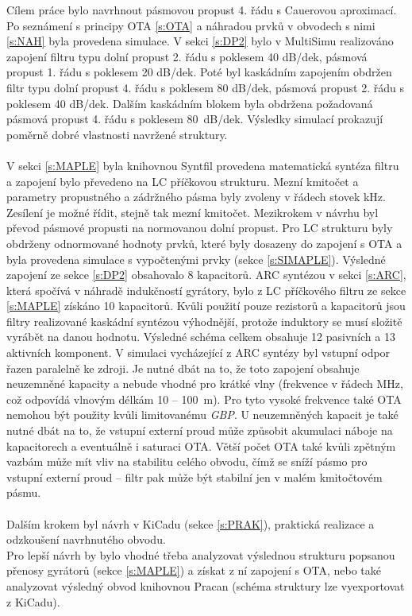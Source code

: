 \noindent Cílem práce bylo navrhnout pásmovou propust 4. řádu s Cauerovou aproximací. Po seznámení s principy OTA \ref{s:OTA} a náhradou prvků v obvodech s nimi \ref{s:NAH} byla provedena simulace. V sekci \ref{s:DP2} bylo v MultiSimu realizováno zapojení filtru typu dolní propust 2. řádu s poklesem 40 dB/dek, pásmová propust 1. řádu s poklesem 20 dB/dek. Poté byl kaskádním zapojením obdržen filtr typu dolní propust 4. řádu s poklesem 80 dB/dek, pásmová propust 2. řádu s poklesem 40 dB/dek. Dalším kaskádním blokem byla obdržena požadovaná pásmová propust 4. řádu s poklesem 80~dB/dek. Výsledky simulací prokazují poměrně dobré vlastnosti navržené struktury.\\
\\
V sekci \ref{s:MAPLE} byla knihovnou Syntfil provedena matematická syntéza filtru a zapojení bylo převedeno na LC příčkovou strukturu. Mezní kmitočet a parametry propustného a zádržného pásma byly zvoleny v řádech stovek kHz. Zesílení je možné řídit, stejně tak mezní kmitočet. Mezikrokem v návrhu byl převod pásmové propusti na normovanou dolní propust. Pro LC strukturu byly obdrženy odnormované hodnoty prvků, které byly dosazeny do zapojení s OTA a byla provedena simulace s vypočtenými prvky (sekce \ref{s:SIMAPLE}). Výsledné zapojení ze sekce \ref{s:DP2} obsahovalo 8 kapacitorů. ARC syntézou v sekci \ref{s:ARC}, která spočívá v náhradě indukčností gyrátory, bylo z LC příčkového filtru ze sekce \ref{s:MAPLE} získáno 10 kapacitorů. Kvůli použití pouze rezistorů a kapacitorů jsou filtry realizované kaskádní syntézou výhodnější, protože induktory se musí složitě vyrábět na danou hodnotu. Výsledné schéma celkem obsahuje 12 pasivních a 13 aktivních komponent. V simulaci vycházející z ARC syntézy byl vstupní odpor řazen paralelně ke zdroji. Je nutné dbát na to, že toto zapojení obsahuje neuzemněné kapacity a nebude vhodné pro krátké vlny (frekvence v řádech MHz, což odpovídá vlnovým délkám 10 -- 100~m). Pro tyto vysoké frekvence také OTA nemohou být použity kvůli limitovanému \textit{GBP}. U neuzemněných kapacit je také nutné dbát na to, že vstupní externí proud může způsobit akumulaci náboje na kapacitorech a eventuálně i saturaci OTA. Větší počet OTA také kvůli zpětným vazbám může mít vliv na stabilitu celého obvodu, čímž se sníží pásmo pro vstupní externí proud -- filtr pak může být stabilní jen v malém kmitočtovém pásmu.\\
\\
Dalším krokem byl návrh v KiCadu (sekce \ref{s:PRAK}), praktická realizace a odzkoušení navrhnutého obvodu.\\
Pro lepší návrh by bylo vhodné třeba analyzovat výslednou strukturu popsanou přenosy gyrátorů (sekce \ref{s:MAPLE}) a získat z ní zapojení s OTA, nebo také analyzovat výsledný obvod knihovnou Pracan (schéma struktury lze vyexportovat z KiCadu).